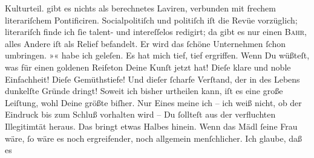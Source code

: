 \begin{ledgroupsized}[t]{13cm}
{{{                  Kulturteil.}}}\label{K_L02616-5h} gibt es nichts als berechnetes Laviren, verbunden mit frechem
               literariſchem Pontificiren. Socialpolitiſch und politiſch iſt die Revüe vorzüglich; literariſch finde ich ſie
               talent- und  intereſſelos redigirt; da gibt es nur
               einen \textsc{Bahr},  alles Andere iſt als Relief befandelt.
                  Er wird das ſchöne Unternehmen ſchon umbringen.\pend
           \pstart
           »\label{K_L02616-111v}\label{K_L02616-111h}« habe ich geleſen. Es hat mich tief, tief ergriffen.
               Wenn Du wüßteſt, was für einen goldenen Reifeton Deine Kunſt jetzt hat! Dieſe klare
               und noble Einfachheit! Dieſe Gemüthstiefe! Und dieſer ſcharfe Verſtand, der in des
               Lebens dunkelſte Gründe dringt! Soweit ich bisher urtheilen kann, iſt es eine große
               Leiſtung, wohl Deine größte biſher. Nur Eines meine ich – ich weiß nicht, ob der
               Eindruck bis zum Schluß vorhalten wird – Du ſollteſt aus der verfluchten Illegitimtät
               heraus. Das bringt etwas {\pb}Halbes hinein. Wenn das
               Mädl ſeine Frau wäre, ſo \strikeout{\textcolor{gray}{×}} wäre es noch ergreifender, noch allgemein menſchlicher. Ich glaube, daß es

\end{ledgroupsized}
